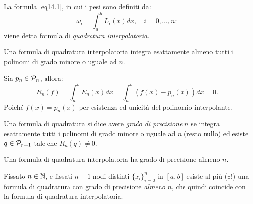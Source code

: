 \begin{defi}La formula \ref{eq14.1}, in cui i pesi sono definiti da:
\[
\omega_i = \int_a^bL_i(x)dx, \quad i = 0, \ldots, n;
\]
viene detta formula di \emph{quadratura interpolatoria}.
\end{defi}

\begin{prop}
Una formula di quadratura interpolatoria integra esattamente almeno tutti
i polinomi di grado minore o uguale ad $n$.
\end{prop}
\begin{dimo}
Sia $p_n \in \mathcal{P}_n$, allora:
\[R_n(f) = \int_a^bE_n(x)dx = \int_a^b\left(f(x)-p_n(x)\right)dx = 0.\]
Poiché $f(x) = p_n(x)$ per esistenza ed unicità del polinomio interpolante.
\end{dimo}

\begin{defi}
Una formula di quadratura si dice avere \emph{grado di precisione} $n$ se
integra esattamente tutti i polinomi di grado minore o uguale ad $n$ (resto
nullo) ed esiste $q \in \mathcal{P}_{n+1}$ tale che $R_n(q) \neq 0$.
\end{defi}

\begin{osse}
Una formula di quadratura interpolatoria ha grado di precisione almeno $n$.
\end{osse}

\begin{teo}
Fissato $n \in \mathbb{N}$, e fissati $n+1$ nodi distinti $\{x_i\}_{i=0}^n$ in $[a,b]$
esiste al più ($\exists!$) una formula di quadratura con grado di precisione
\emph{almeno} $n$, che quindi coincide con la formula di quadratura 
interpolatoria. 
\end{teo}

